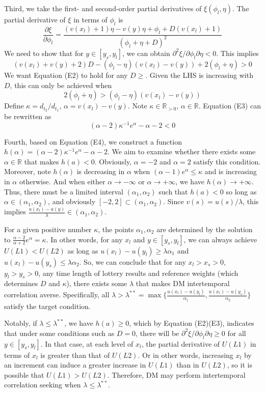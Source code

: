 \documentclass[
  12pt,
]{article}
\begin{document}
Third, we take the first- and second-order partial derivatives of
\(\xi(\phi_l,\eta)\). The partial derivative of \(\xi\) in terms of
\(\phi_l\) is\[
\frac{\partial \xi}{\partial \phi_l}=\frac{(v(x_l)+1)\eta-v(y)\eta+\phi_l+D(v(x_l)+1)}{(\phi_l+\eta+D)^2}
\]We need to show that for \(y\in[y_s,y_l]\), we can obtain
\(\partial^2 \xi/\partial \phi_l\partial \eta<0\). This
implies\[\tag{E2}
(v(x_l)+v(y)+2)D-(\phi_l-\eta)(v(x_l)-v(y))+2(\phi_l+\eta)>0
\]We want Equation (E2) to hold for any \(D\geq\). Given the LHS is
increasing with \(D\), this can only be achieved when\[\tag{E3}
2(\phi_l+\eta)>(\phi_l-\eta)(v(x_l)-v(y))
\]Define \(\kappa=d_{t_2}/d_{t_1}\), \(\alpha=v(x_l)-v(y)\). Note
\(\kappa\in \mathbb{R}_{>0}\), \(\alpha\in\mathbb{R}\). Equation (E3)
can be rewritten as\[\tag{E4}
(\alpha-2)\kappa^{-1} e^{\alpha}-\alpha-2<0
\]

Fourth, based on Equation (E4), we construct a function
\(h(\alpha)=(\alpha-2)\kappa^{-1} e^\alpha-\alpha-2\). We aim to examine
whether there exists some \(\alpha\in\mathbb{R}\) that makes \(h(a)<0\).
Obviously, \(\alpha=-2\) and \(\alpha=2\) satisfy this condition.
Moreover, note \(h(\alpha)\) is decreasing in \(\alpha\) when
\((\alpha-1)e^{\alpha}\leq \kappa\) and is increasing in \(\alpha\)
otherwise. And when either \(\alpha\rightarrow -\infty\) or
\(\alpha \rightarrow +\infty\), we have
\(h(\alpha)\rightarrow +\infty\). Thus, there must be a limited interval
\((\alpha_1,\alpha_2)\) such that \(h(a)<0\) so long as
\(\alpha\in(\alpha_1,\alpha_2)\), and obviously
\([-2,2]\subset(\alpha_1,\alpha_2)\). Since \(v(s)=u(s)/\lambda\), this
implies \(\frac{u(x_l)-u(y)}{\lambda}\in(\alpha_1,\alpha_2)\).

For a given positive number \(\kappa\), the points \(\alpha_1,\alpha_2\)
are determined by the solution to
\(\frac{\alpha-2}{\alpha+2}e^{\alpha}=\kappa\). In other words, for any
\(x_l\) and \(y\in[y_s,y_l]\), we can always achieve \(U(L1)<U(L2)\) as
long as \(u(x_l)-u(y_l)\geq \lambda\alpha_1\) and
\(u(x_l)-u(y_s)\leq\lambda\alpha_2\). So, we can conclude that for any
\(x_l>x_s>0\), \(y_l>y_s>0\), any time length of lottery results and
reference weights (which determines \(D\) and \(\kappa\)), there exists
some \(\lambda\) that makes DM intertemporal correlation averse.
Specifically, all
\(\lambda>\lambda^{**} ={\max}\{\frac{u(x_l)-u(y_l)}{\alpha_1},\frac{u(x_l)-u(y_s)}{\alpha_2}\}\)
satisfy the target condition.

Notably, if \(\lambda\leq\lambda^{**}\), we have \(h(a)\geq0\), which by
Equation (E2)(E3), indicates that under some conditions such as \(D=0\),
there will be \(\partial^2 \xi/\partial \phi_l\partial \eta\geq0\) for
all \(y\in[y_s,y_l]\). In that case, at each level of \(x_l\), the
partial derivative of \(U(L1)\) in terms of \(x_l\) is greater than that
of \(U(L2)\). Or in other words, increasing \(x_l\) by an increment can
induce a greater increase in \(U(L1)\) than in \(U(L2)\), so it is
possible that \(U(L1)>U(L2)\). Therefore, DM may perform intertemporal
correlation seeking when \(\lambda\leq\lambda^{**}\).
\end{document}

